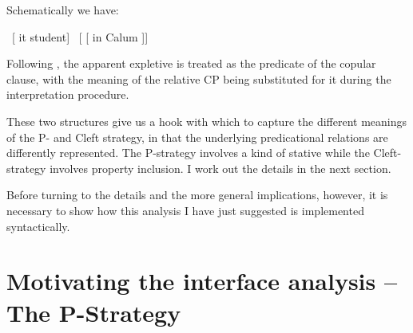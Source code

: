 \documentclass[output=paper]{langsci/langscibook}
\begin{document}
%
%

Schematically we have:

\ea \ [ \Cop{} it student]  \ [ [  in Calum ]] \z

Following \citet{adger-ramchand:05}, the apparent expletive is treated as the
predicate of the copular clause, with the meaning of the relative CP being
substituted for it during the interpretation procedure.

These two structures give us a hook with which to capture the different
meanings of the P- and Cleft strategy, in that the underlying predicational
relations are differently represented. The P-strategy involves a kind of
stative  while the Cleft-strategy involves property inclusion.  I
work out the details in the next section.

%
%

Before turning to the details and the more general implications, however, it is
necessary to show how this analysis I have just suggested is  implemented
syntactically.

\section{Motivating the interface analysis -- The P-Strategy}
\end{document}
